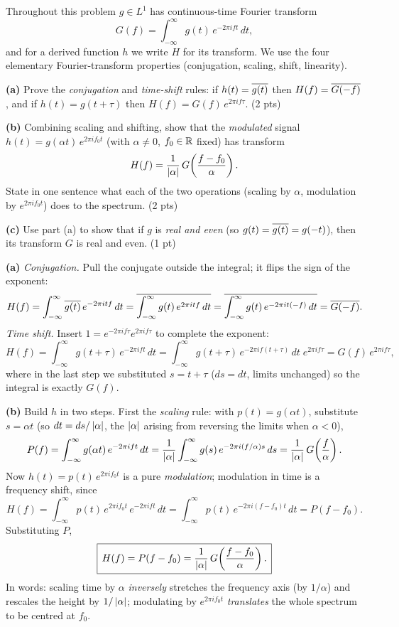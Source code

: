 \documentclass[11pt]{article}
\begin{document}

\statementstart
Throughout this problem $g\in L^1$ has continuous-time Fourier transform
\[
G(f)=\int_{-\infty}^{\infty} g(t)\,e^{-2\pi i f t}\,dt ,
\]
and for a derived function $h$ we write $H$ for its transform. We use the four elementary Fourier-transform properties (conjugation, scaling, shift, linearity).

\textbf{(a)} Prove the \emph{conjugation} and \emph{time-shift} rules: if $h(t)=\overline{g(t)}$ then $H(f)=\overline{G(-f)}$, and if $h(t)=g(t+\tau)$ then $H(f)=G(f)\,e^{2\pi i f\tau}$. \hfill(2 pts)

\textbf{(b)} Combining scaling and shifting, show that the \emph{modulated} signal $h(t)=g(\alpha t)\,e^{2\pi i f_0 t}$ (with $\alpha\neq0$, $f_0\in\mathbb{R}$ fixed) has transform
\[
H(f)=\frac{1}{\left\lvert \alpha \right\rvert}\,G\!\left(\frac{f-f_0}{\alpha}\right).
\]
State in one sentence what each of the two operations (scaling by $\alpha$, modulation by $e^{2\pi i f_0 t}$) does to the spectrum. \hfill(2 pts)

\textbf{(c)} Use part (a) to show that if $g$ is \emph{real and even} (so $g(t)=\overline{g(t)}=g(-t)$), then its transform $G$ is real and even. \hfill(1 pt)
\statementend

\textbf{(a)} \emph{Conjugation.} Pull the conjugate outside the integral; it flips the sign of the exponent:
\[
H(f)=\int_{-\infty}^{\infty}\overline{g(t)}\,e^{-2\pi i t f}\,dt
=\overline{\int_{-\infty}^{\infty} g(t)\,e^{2\pi i t f}\,dt}
=\overline{\int_{-\infty}^{\infty} g(t)\,e^{-2\pi i t(-f)}\,dt}
=\overline{G(-f)} .
\]
\emph{Time shift.} Insert $1=e^{-2\pi i f\tau}e^{2\pi i f\tau}$ to complete the exponent:
\[
H(f)=\int_{-\infty}^{\infty} g(t+\tau)\,e^{-2\pi i f t}\,dt
=\int_{-\infty}^{\infty} g(t+\tau)\,e^{-2\pi i f(t+\tau)}\,dt\;e^{2\pi i f\tau}
=G(f)\,e^{2\pi i f\tau},
\]
where in the last step we substituted $s=t+\tau$ ($ds=dt$, limits unchanged) so the integral is exactly $G(f)$.

\textbf{(b)} Build $h$ in two steps. First the \emph{scaling} rule: with $p(t)=g(\alpha t)$, substitute $s=\alpha t$ (so $dt=ds/\left\lvert \alpha \right\rvert$, the $\left\lvert \alpha \right\rvert$ arising from reversing the limits when $\alpha<0$),
\[
P(f)=\int_{-\infty}^{\infty} g(\alpha t)\,e^{-2\pi i f t}\,dt
=\frac{1}{\left\lvert \alpha \right\rvert}\int_{-\infty}^{\infty} g(s)\,e^{-2\pi i (f/\alpha)s}\,ds
=\frac{1}{\left\lvert \alpha \right\rvert}\,G\!\left(\frac{f}{\alpha}\right).
\]
Now $h(t)=p(t)\,e^{2\pi i f_0 t}$ is a pure \emph{modulation}; modulation in time is a frequency shift, since
\[
H(f)=\int_{-\infty}^{\infty} p(t)\,e^{2\pi i f_0 t}\,e^{-2\pi i f t}\,dt
=\int_{-\infty}^{\infty} p(t)\,e^{-2\pi i (f-f_0) t}\,dt
=P(f-f_0).
\]
Substituting $P$,
\[
\boxed{\,H(f)=P(f-f_0)=\frac{1}{\left\lvert \alpha \right\rvert}\,G\!\left(\frac{f-f_0}{\alpha}\right).\,}
\]
In words: scaling time by $\alpha$ \emph{inversely} stretches the frequency axis (by $1/\alpha$) and rescales the height by $1/\left\lvert \alpha \right\rvert$; modulating by $e^{2\pi i f_0 t}$ \emph{translates} the whole spectrum to be centred at $f_0$.
\end{document}
